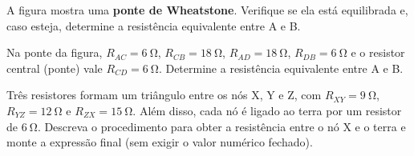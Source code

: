 \blocoaprofundamento
\begin{questao}[3]{}

A figura mostra uma \textbf{ponte de Wheatstone}. Verifique se ela está
equilibrada e, caso esteja, determine a resistência equivalente entre A e B.




\end{questao}
\begin{questao}[3]{}

Na ponte da figura, $R_{AC}=\SI{6}{\ohm}$, $R_{CB}=\SI{18}{\ohm}$,
$R_{AD}=\SI{18}{\ohm}$, $R_{DB}=\SI{6}{\ohm}$ e o resistor central (ponte) vale
$R_{CD}=\SI{6}{\ohm}$. Determine a resistência equivalente entre A e B.




\end{questao}
\begin{questao}[3]{}

Três resistores formam um triângulo entre os nós X, Y e Z, com
$R_{XY}=\SI{9}{\ohm}$, $R_{YZ}=\SI{12}{\ohm}$ e $R_{ZX}=\SI{15}{\ohm}$. Além
disso, cada nó é ligado ao terra por um resistor de $\SI{6}{\ohm}$. Descreva o
procedimento para obter a resistência entre o nó X e o terra e monte a expressão
final (sem exigir o valor numérico fechado).


\end{questao}
